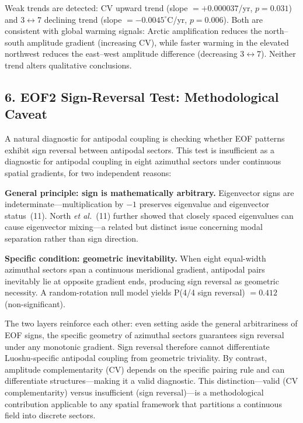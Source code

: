 \documentclass[10pt]{article}
\begin{document}
Weak trends are detected: CV upward trend (slope $= +0.000037$/yr, $p = 0.031$) and 3$\leftrightarrow$7 declining trend (slope $= -0.0045^\circ$C/yr, $p = 0.006$). Both are consistent with global warming signals: Arctic amplification reduces the north--south amplitude gradient (increasing CV), while faster warming in the elevated northwest reduces the east--west amplitude difference (decreasing 3$\leftrightarrow$7). Neither trend alters qualitative conclusions.

\subsection*{6. EOF2 Sign-Reversal Test: Methodological Caveat}

A natural diagnostic for antipodal coupling is checking whether EOF patterns exhibit sign reversal between antipodal sectors. This test is insufficient as a diagnostic for antipodal coupling in eight azimuthal sectors under continuous spatial gradients, for two independent reasons:

\textbf{General principle: sign is mathematically arbitrary.} Eigenvector signs are indeterminate---multiplication by $-1$ preserves eigenvalue and eigenvector status~(11). North \textit{et al.}~(11) further showed that closely spaced eigenvalues can cause eigenvector mixing---a related but distinct issue concerning modal separation rather than sign direction.

\textbf{Specific condition: geometric inevitability.} When eight equal-width azimuthal sectors span a continuous meridional gradient, antipodal pairs inevitably lie at opposite gradient ends, producing sign reversal as geometric necessity. A random-rotation null model yields P(4/4 sign reversal) $= 0.412$ (non-significant).

The two layers reinforce each other: even setting aside the general arbitrariness of EOF signs, the specific geometry of azimuthal sectors guarantees sign reversal under any monotonic gradient. Sign reversal therefore cannot differentiate Luoshu-specific antipodal coupling from geometric triviality. By contrast, amplitude complementarity (CV) depends on the specific pairing rule and can differentiate structures---making it a valid diagnostic. This distinction---valid (CV complementarity) versus insufficient (sign reversal)---is a methodological contribution applicable to any spatial framework that partitions a continuous field into discrete sectors.
\end{document}
